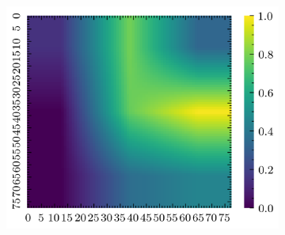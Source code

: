 \begin{figure}[H]
\begin{subfigure}[b]{0.19\textwidth}
        \includegraphics[width=\linewidth]{../img/5/quarry/false_positive/grad-cam-2d-4.png}
    \end{subfigure}  


\end{figure}
